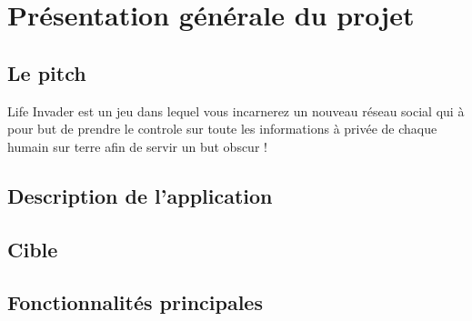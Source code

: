 \chapter{Présentation générale du projet}
\label{chap:premierchapitre}

\section{Le pitch}
Life Invader est un jeu dans lequel vous incarnerez un nouveau réseau social qui à pour but de prendre le controle sur toute les informations à privée de chaque humain sur terre afin de servir un but obscur !

\section{Description de l'application}

\section{Cible}

\section{Fonctionnalités principales}


